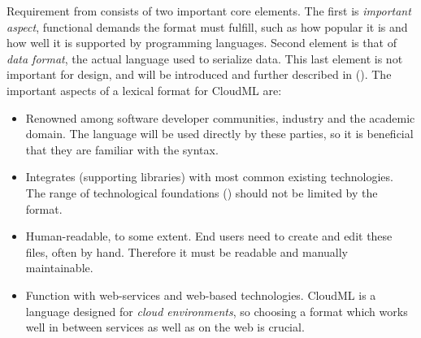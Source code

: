 Requirement  from  consists of two
important core elements.
The first is \emph{important aspect}, \ie functional demands the format must fulfill,
such as how popular it is and how well it is supported by programming languages.
Second element is that of \emph{data format}, \ie the actual language used to 
serialize data.
This last element is not important for design, and will be introduced and
further described in  ().
The important aspects of a lexical format for CloudML are:
\begin{itemize}
  \item Renowned among software developer communities, industry and the academic domain.
    The language will be used directly by these parties, so it is beneficial
    that they are familiar with the syntax.
  \item Integrates (supporting libraries) with most common existing technologies.
    The range of technological foundations () should not be
    limited by the format.
  \item Human-readable, to some extent.
    End users need to create and edit these files, often by hand.
    Therefore it must be readable and manually maintainable.
  \item Function with web-services and web-based technologies.
    CloudML is a language designed for \emph{cloud environments},
    so choosing a format which works well in between services as well as on the web is crucial.
\end{itemize}

